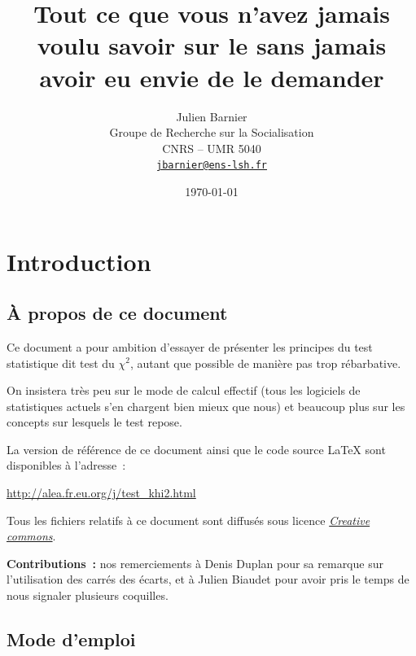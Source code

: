 \documentclass[a4paper,10pt,twoside,francais]{report}
\title{Tout ce que vous n'avez jamais voulu savoir sur le \chid sans
  jamais avoir eu envie de le demander}
\author{Julien Barnier\\ Groupe de Recherche sur la Socialisation\\
  CNRS -- UMR 5040\\ \href{mailto:jbarnier@ens-lsh.fr}{\texttt{jbarnier@ens-lsh.fr}}}
\date{\today{}}
\newcommand{\chid}{$\chi^2$\xspace}
\begin{document}
\renewcommand\chaptername{Partie}

\maketitle
\thispagestyle{empty}

\pagestyle{fancy} 
\renewcommand{\chaptermark}[1]{\markboth{#1}{}}
\renewcommand{\sectionmark}[1]{\markright{\thesection.\ #1}}
\fancyhead{}
\fancyhead[RO,LE]{\thepage}
\fancyhead[RE]{\nouppercase{\leftmark}}
\fancyhead[LO]{\nouppercase{\rightmark}}
\fancyfoot{}

\tableofcontents


\sloppy

\setlength{\parskip}{1.5ex}


\chapter{Introduction}

\section{À propos de ce document}

Ce document a pour ambition d'essayer de présenter les principes du
test statistique dit \og test du \chid \fg{}, autant que possible de
manière pas trop rébarbative.

On insistera très peu sur le mode de calcul effectif (tous les
logiciels de statistiques actuels s'en chargent bien mieux que nous)
et beaucoup plus sur les concepts sur lesquels le test repose.

La version de référence de ce document ainsi que le code source
\LaTeX{} sont disponibles à l'adresse~:

\url{http://alea.fr.eu.org/j/test_khi2.html}

Tous les fichiers relatifs à ce document sont diffusés sous licence
\href{http://creativecommons.org/licenses/by/2.0/fr/}{\textit{Creative commons}}.

\textbf{Contributions~: } nos remerciements à Denis Duplan pour sa
remarque sur l'utilisation des carrés des écarts, et à Julien Biaudet
pour avoir pris le temps de nous signaler plusieurs coquilles.

\section{Mode d'emploi}
\end{document}
